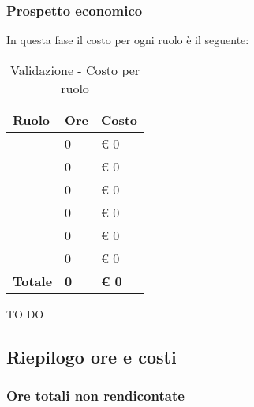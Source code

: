 		\subsubsection{Prospetto economico} %
		\label{ssub:prospetto_economico}
		In questa fase il costo per ogni ruolo è il seguente: \\
				\begin{table}[!h]
					\begin{center}
						\begin{tabularx}{0.6\textwidth}{|l|l|X|}
							\hline
							\textbf{Ruolo} & \textbf{Ore} & \textbf{Costo} \\
							\hline
							\roleProjectManager & 0 & \euro{} 0 \\
							\hline
							\roleAnalyst & 0 & \euro{} 0 \\
							\hline
							\roleDesigner & 0 & \euro{} 0 \\
							\hline
							\roleAdministrator & 0 & \euro{} 0 \\
							\hline
							\roleProgrammer & 0 & \euro{} 0 \\
							\hline
							\roleVerifier & 0 & \euro{} 0 \\
							\hline
							\textbf{Totale} & \textbf{0} & \textbf{\euro{} 0} \\
							\hline
						\end{tabularx}
					\end{center}
				\caption{Validazione - Costo per ruolo}
				\end{table}

			\noindent
			TO DO
		
	
	\subsection{Riepilogo ore e costi} %
	\label{sub:riepilogo_ore_e_costi}
			
		\subsubsection{Ore totali non rendicontate} %
		\label{ssub:ore_totali_non_rendicontate}
